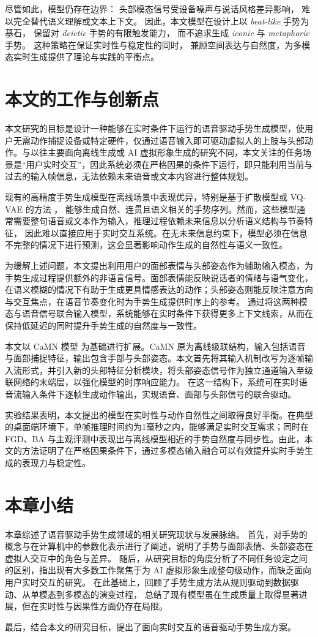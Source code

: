 尽管如此，模型仍存在边界：
头部模态信号受设备噪声与说话风格差异影响，
难以完全替代语义理解或文本上下文。
因此，本文模型在设计上以 \emph{beat-like} 手势为基石，
保留对 \emph{deictic} 手势的有限触发能力，
而不追求生成 \emph{iconic} 与 \emph{metaphoric} 手势。
这种策略在保证实时性与稳定性的同时，
兼顾空间表达与自然度，为多模态实时生成提供了理论与实践的平衡点。

\section{本文的工作与创新点}

本文研究的目标是设计一种能够在实时条件下运行的语音驱动手势生成模型，使用户无需动作捕捉设备或特定硬件，仅通过语音输入即可驱动虚拟人的上肢与头部动作。与以往主要面向离线生成或 AI 虚拟形象生成的研究不同，本文关注的任务场景是“用户实时交互”，因此系统必须在严格因果的条件下运行，即只能利用当前与过去的输入帧信息，无法依赖未来语音或文本内容进行整体规划。

现有的高精度手势生成模型在离线场景中表现优异，特别是基于扩散模型或 VQ-VAE 的方法 \cite{tamingDiffgesture, diffsheg, emage, DiffTED2024}， 能够生成自然、连贯且语义相关的手势序列。然而，这些模型通常需要整句语音或文本作为输入，推理过程依赖未来信息以分析语义结构与节奏特征，  
因此难以直接应用于实时交互系统。在无未来信息约束下，模型必须在信息不完整的情况下进行预测，这会显著影响动作生成的自然性与语义一致性。

为缓解上述问题，本文提出利用用户的面部表情与头部姿态作为辅助输入模态，为手势生成过程提供额外的非语言信号。面部表情能反映说话者的情绪与语气变化，在语义模糊的情况下有助于生成更具情感表达的动作；头部姿态则能反映注意方向与交互焦点，在语音节奏变化时为手势生成提供时序上的参考。  
通过将这两种模态与语音信号联合输入模型，系统能够在实时条件下获得更多上下文线索，从而在保持低延迟的同时提升手势生成的自然度与一致性。

本文以 CaMN 模型 \cite{beatcamn} 为基础进行扩展。CaMN 原为离线级联结构，输入包括语音与面部捕捉特征，输出包含手部与头部姿态。本文首先将其输入机制改写为逐帧输入流形式，并引入新的头部特征分析模块，将头部姿态信号作为独立通道输入至级联网络的末端层，以强化模型的时序响应能力。  
在这一结构下，系统可在实时语音流输入条件下逐帧生成动作输出，实现语音、面部与头部信号的联合驱动。

实验结果表明，本文提出的模型在实时性与动作自然性之间取得良好平衡。在典型的桌面端环境下，单帧推理时间约为1毫秒之内，能够满足实时交互需求；同时在 FGD、BA 与主观评测中表现出与离线模型相近的手势自然度与同步性。由此，本文的方法证明了在严格因果条件下，通过多模态输入融合可以有效提升实时手势生成的表现力与稳定性。

\section{本章小结}
本章综述了语音驱动手势生成领域的相关研究现状与发展脉络。  
首先，对手势的概念与在计算机中的参数化表示进行了阐述，说明了手势与面部表情、头部姿态在虚拟人交互中的角色与差异。  
随后，从研究目标的角度分析了不同任务设定之间的区别，指出现有大多数工作聚焦于为 AI 虚拟形象生成整句级动作，而缺乏面向用户实时交互的研究。  
在此基础上，回顾了手势生成方法从规则驱动到数据驱动、从单模态到多模态的演变过程，  
总结了现有模型虽在生成质量上取得显著进展，但在实时性与因果性方面仍存在局限。

最后，结合本文的研究目标，提出了面向实时交互的语音驱动手势生成方案。

